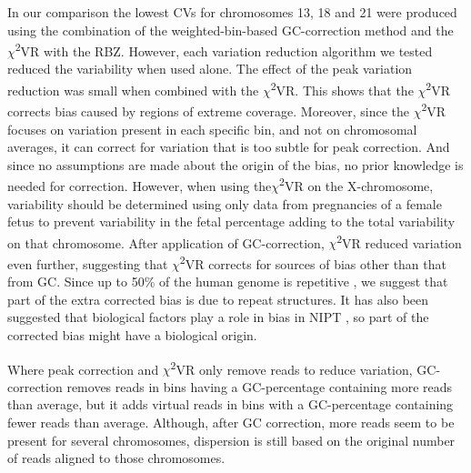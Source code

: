 In our comparison the lowest CVs for chromosomes 13, 18 and 21 were produced using the combination of the weighted-bin-based GC-correction method and the $\chi$\textsuperscript{2}VR with the RBZ. 
However, each variation reduction algorithm we tested reduced the variability when used alone. 
The effect of the peak variation reduction was small when combined with the $\chi$\textsuperscript{2}VR. 
This shows that the $\chi$\textsuperscript{2}VR corrects bias caused by regions of extreme coverage. 
Moreover, since the $\chi$\textsuperscript{2}VR focuses on variation present in each specific bin, and not on chromosomal averages, it can correct for variation that is too subtle for peak correction. 
And since no assumptions are made about the origin of the bias, no prior knowledge is needed for correction. 
However, when using the$\chi$\textsuperscript{2}VR on the X-chromosome, variability should be determined using only data from pregnancies of a female fetus to prevent variability in the fetal percentage adding to the total variability on that chromosome. 
After application of GC-correction, $\chi$\textsuperscript{2}VR reduced variation even further, suggesting that $\chi$\textsuperscript{2}VR corrects for sources of bias other than that from GC. 
Since up to 50\% of the human genome is repetitive \cite{Smit_2013}, we suggest that part of the extra corrected bias is due to repeat structures. 
It has also been suggested that biological factors play a role in bias in NIPT \cite{van_den_Oever_2013,Chandrananda_2014}, so part of the corrected bias might have a biological origin.

Where peak correction and $\chi$\textsuperscript{2}VR only remove reads to reduce variation, GC-correction removes reads in bins having a GC-percentage containing more reads than average, but it adds virtual reads in bins with a GC-percentage containing fewer reads than average. 
Although, after GC correction, more reads seem to be present for several chromosomes, dispersion is still based on the original number of reads aligned to those chromosomes.


